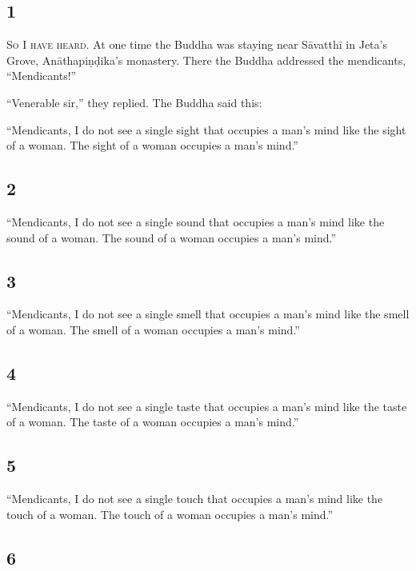 \documentclass[12pt,openany]{book}%
\newcommand*{\scevam}[1]{\textsc{#1}}
\begin{document}
\subsection*{1 }

\scevam{So I have heard. }At one time the Buddha was staying near \textsanskrit{Sāvatthī} in Jeta’s Grove, \textsanskrit{Anāthapiṇḍika}’s monastery. There the Buddha addressed the mendicants, “Mendicants!” 

“Venerable sir,” they replied. The Buddha said this: 

“Mendicants, I do not see a single sight that occupies a man’s mind like the sight of a woman. The sight of a woman occupies a man’s mind.” 

\subsection*{2 }

“Mendicants, I do not see a single sound that occupies a man’s mind like the sound of a woman. The sound of a woman occupies a man’s mind.” 

\subsection*{3 }

“Mendicants, I do not see a single smell that occupies a man’s mind like the smell of a woman. The smell of a woman occupies a man’s mind.” 

\subsection*{4 }

“Mendicants, I do not see a single taste that occupies a man’s mind like the taste of a woman. The taste of a woman occupies a man’s mind.” 

\subsection*{5 }

“Mendicants, I do not see a single touch that occupies a man’s mind like the touch of a woman. The touch of a woman occupies a man’s mind.” 

\subsection*{6 }
\end{document}
